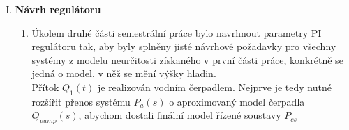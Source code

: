 \documentclass[12pt,a4paper]{article}
\begin{document}
\begin{enumerate}[I.]
\begin{enumerate}[1.]
		\end{enumerate}
		\item\textbf{Návrh regulátoru}\\
		\begin{enumerate}[1.]
				\item Úkolem druhé části semestrální práce bylo navrhnout parametry PI regulátoru tak, aby byly splněny jisté návrhové požadavky pro všechny systémy z modelu neurčitosti získaného v první části práce, konkrétně se jedná o model, v něž se mění výšky hladin.\\
				Přítok $Q_1(t)$ je realizován vodním čerpadlem. Nejprve je tedy nutné rozšířit přenos systému $P_a(s)$ o aproximovaný model čerpadla $Q_{pump}(s)$, abychom dostali finální model řízené soustavy $P_{cs}$
				{\footnotesize				
				\begin{gather*}

\end{gather*}}
\end{enumerate}
\end{enumerate}
\end{document}

